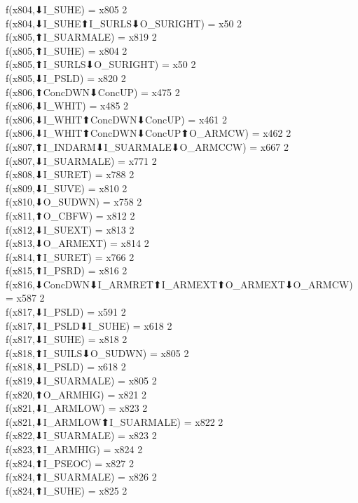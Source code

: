 f(x804,⬇I_SUHE) = x805 {2} \\
f(x804,⬇I_SUHE⬆I_SURLS⬇O_SURIGHT) = x50 {2} \\
f(x805,⬆I_SUARMALE) = x819 {2} \\
f(x805,⬆I_SUHE) = x804 {2} \\
f(x805,⬆I_SURLS⬇O_SURIGHT) = x50 {2} \\
f(x805,⬇I_PSLD) = x820 {2} \\
f(x806,⬆ConcDWN⬇ConcUP) = x475 {2} \\
f(x806,⬇I_WHIT) = x485 {2} \\
f(x806,⬇I_WHIT⬆ConcDWN⬇ConcUP) = x461 {2} \\
f(x806,⬇I_WHIT⬆ConcDWN⬇ConcUP⬆O_ARMCW) = x462 {2} \\
f(x807,⬆I_INDARM⬇I_SUARMALE⬇O_ARMCCW) = x667 {2} \\
f(x807,⬇I_SUARMALE) = x771 {2} \\
f(x808,⬇I_SURET) = x788 {2} \\
f(x809,⬇I_SUVE) = x810 {2} \\
f(x810,⬇O_SUDWN) = x758 {2} \\
f(x811,⬆O_CBFW) = x812 {2} \\
f(x812,⬇I_SUEXT) = x813 {2} \\
f(x813,⬇O_ARMEXT) = x814 {2} \\
f(x814,⬆I_SURET) = x766 {2} \\
f(x815,⬆I_PSRD) = x816 {2} \\
f(x816,⬇ConcDWN⬇I_ARMRET⬆I_ARMEXT⬆O_ARMEXT⬇O_ARMCW) = x587 {2} \\
f(x817,⬇I_PSLD) = x591 {2} \\
f(x817,⬇I_PSLD⬇I_SUHE) = x618 {2} \\
f(x817,⬇I_SUHE) = x818 {2} \\
f(x818,⬆I_SUILS⬇O_SUDWN) = x805 {2} \\
f(x818,⬇I_PSLD) = x618 {2} \\
f(x819,⬇I_SUARMALE) = x805 {2} \\
f(x820,⬆O_ARMHIG) = x821 {2} \\
f(x821,⬇I_ARMLOW) = x823 {2} \\
f(x821,⬇I_ARMLOW⬆I_SUARMALE) = x822 {2} \\
f(x822,⬇I_SUARMALE) = x823 {2} \\
f(x823,⬆I_ARMHIG) = x824 {2} \\
f(x824,⬆I_PSEOC) = x827 {2} \\
f(x824,⬆I_SUARMALE) = x826 {2} \\
f(x824,⬆I_SUHE) = x825 {2} \\
